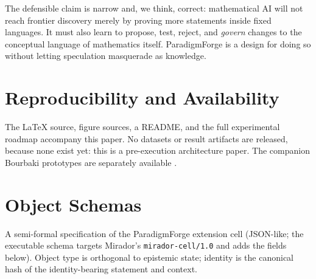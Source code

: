 \documentclass[11pt]{article}
\theoremstyle{definition}
\theoremstyle{remark}
\newcommand{\PF}{ParadigmForge}
\begin{document}
The defensible claim is narrow and, we think, correct: mathematical AI will not reach frontier
discovery merely by proving more statements inside fixed languages. It must also learn to propose,
test, reject, and \emph{govern} changes to the conceptual language of mathematics itself. \PF{} is a
design for doing so without letting speculation masquerade as knowledge.

\section*{Reproducibility and Availability}
The LaTeX source, figure sources, a README, and the full experimental roadmap accompany this paper.
No datasets or result artifacts are released, because none exist yet: this is a pre-execution
architecture paper. The companion Bourbaki prototypes are separately available
\citep{lucius2026mirador,lucius2026proofcontext}.




\appendix
\section{Object Schemas}
\label{app:schema}

A semi-formal specification of the \PF{} extension cell (JSON-like; the executable schema targets
Mirador's \texttt{mirador-cell/1.0} and adds the fields below). Object type is orthogonal to
epistemic state; identity is the canonical hash of the identity-bearing statement and context.
\end{document}
